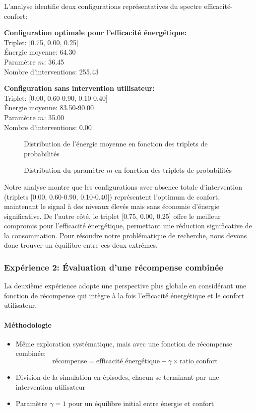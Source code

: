 L'analyse identifie deux configurations représentatives du spectre efficacité-confort:

\begin{mdframed}
\textbf{Configuration optimale pour l'efficacité énergétique:}\\
Triplet: [0.75, 0.00, 0.25]\\
Énergie moyenne: 64.30\\
Paramètre $m$: 36.45 \\
Nombre d'interventions: 255.43

\textbf{Configuration sans intervention utilisateur:}\\
Triplet: [0.00, 0.60-0.90, 0.10-0.40]\\
Énergie moyenne: 83.50-90.00\\
Paramètre $m$: 35.00 \\
Nombre d'interventions: 0.00
\end{mdframed}

\begin{figure}[h]
    \centering
    \caption{Distribution de l'énergie moyenne en fonction des triplets de probabilités}
    \label{fig:energie_3d}
\end{figure}

\begin{figure}[h]
    \centering
    \caption{Distribution du paramètre $m$ en fonction des triplets de probabilités}
    \label{fig:parametre_m_3d}
\end{figure}
Notre analyse montre que les configurations avec absence totale d'intervention (triplets [0.00, 0.60-0.90, 0.10-0.40]) représentent l'optimum de confort, maintenant le signal à des niveaux élevés mais sans économie d'énergie significative. De l'autre côté, le triplet [0.75, 0.00, 0.25] offre le meilleur compromis pour l'efficacité énergétique, permettant une réduction significative de la consommation. Pour résoudre notre problématique de recherche, nous devons donc trouver un équilibre entre ces deux extrêmes.
\subsubsection{Expérience 2: Évaluation d'une récompense combinée}

La deuxième expérience adopte une perspective plus globale en considérant une fonction de récompense qui intègre à la fois l'efficacité énergétique et le confort utilisateur.

\paragraph{Méthodologie}
\begin{itemize}
    \item Même exploration systématique, mais avec une fonction de récompense combinée:
    $$\text{récompense} = \text{efficacité\_énergétique} + \gamma \times \text{ratio\_confort}$$
    \item Division de la simulation en épisodes, chacun se terminant par une intervention utilisateur
    \item Paramètre $\gamma=1$ pour un équilibre initial entre énergie et confort
\end{itemize}


